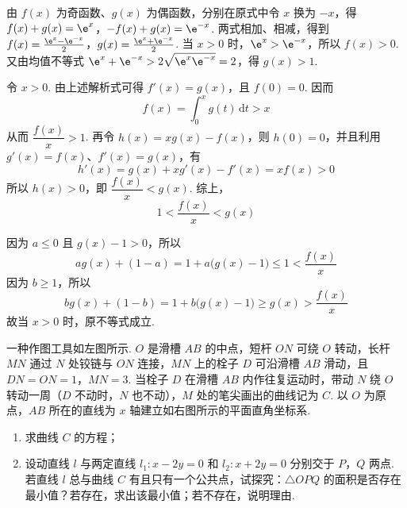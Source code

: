\begin{solution}
由 \(f(x)\) 为奇函数、\(g(x)\) 为偶函数，分别在原式中令 \(x\) 换为 \(-x\)，得
\(f(x)+g(x)=\e^x\)，\(-f(x)+g(x)=\e^{-x}\).
两式相加、相减，得到
\(f(x)=\frac{\e^x-\e^{-x}}{2}\)，\(g(x)=\frac{\e^x+\e^{-x}}{2}\).
当 \(x>0\) 时，\(\e^x>\e^{-x}\)，所以 \(f(x)>0\). 又由均值不等式
\(\e^x+\e^{-x}>2\sqrt{\e^x\e^{-x}}=2\)，得 \(g(x)>1\).

令 \(x>0\). 由上述解析式可得 \(f'(x)=g(x)\)，且 \(f(0)=0\). 因而
\[
f(x)=\int_0^x g(t)\,\mathrm{d}t>x
\]
从而 \(\dfrac{f(x)}{x}>1\). 再令 \(h(x)=xg(x)-f(x)\)，则 \(h(0)=0\)，并且利用 \(g'(x)=f(x)\)、\(f'(x)=g(x)\)，有
\[
h'(x)=g(x)+xg'(x)-f'(x)=xf(x)>0
\]
所以 \(h(x)>0\)，即 \(\dfrac{f(x)}{x}<g(x)\). 综上，
\[
1<\frac{f(x)}{x}<g(x)
\]

因为 \(a\leqslant0\) 且 \(g(x)-1>0\)，所以
\[
ag(x)+(1-a)=1+a\bigl(g(x)-1\bigr)\leqslant1<\frac{f(x)}{x}
\]
因为 \(b\geqslant1\)，所以
\[
bg(x)+(1-b)=1+b\bigl(g(x)-1\bigr)\geqslant g(x)>\frac{f(x)}{x}
\]
故当 \(x>0\) 时，原不等式成立.
\end{solution}

\begin{problem}
一种作图工具如左图所示. \(O\) 是滑槽 \(AB\) 的中点，短杆 \(ON\) 可绕 \(O\) 转动，长杆 \(MN\) 通过 \(N\) 处铰链与 \(ON\) 连接，\(MN\) 上的栓子 \(D\) 可沿滑槽 \(AB\) 滑动，且 \(DN=ON=1\)，\(MN=3\). 当栓子 \(D\) 在滑槽 \(AB\) 内作往复运动时，带动 \(N\) 绕 \(O\) 转动一周（\(D\) 不动时，\(N\) 也不动），\(M\) 处的笔尖画出的曲线记为 \(C\). 以 \(O\) 为原点，\(AB\) 所在的直线为 \(x\) 轴建立如右图所示的平面直角坐标系.

\begin{enumerate}
\item 求曲线 \(C\) 的方程；
\item 设动直线 \(l\) 与两定直线 \(l_1\colon x-2y=0\) 和 \(l_2\colon x+2y=0\) 分别交于 \(P\)，\(Q\) 两点. 若直线 \(l\) 总与曲线 \(C\) 有且只有一个公共点，试探究：\(\triangle OPQ\) 的面积是否存在最小值？若存在，求出该最小值；若不存在，说明理由.
\end{enumerate}

\FloatBarrier
\end{problem}

